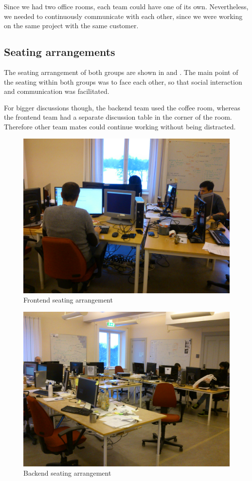 Since we had two office rooms, each team could have one of its own.
Nevertheless, we needed to continuously communicate with each other,
since we were working on the same project with the same customer.

\subsection{Seating arrangements}
The seating arrangement of both groups are shown in  and
. The main point of the seating within both groups
was to face each other, so that social interaction and communication was facilitated. 

For bigger discussions though, the backend team used the coffee room, whereas the
frontend team had a separate discussion table in the corner of the room. Therefore
other team mates could continue working without being distracted.

\begin{figure}
\centering
\includegraphics[scale=0.1]{graphics/frontend_seating}
\caption{Frontend seating arrangement}\label{fig:frontend_seating}
\end{figure}


\begin{figure}
\centering
\includegraphics[scale=0.1]{graphics/backend_seating}
\caption{Backend seating arrangement}\label{fig:backend_seating}
\end{figure}
